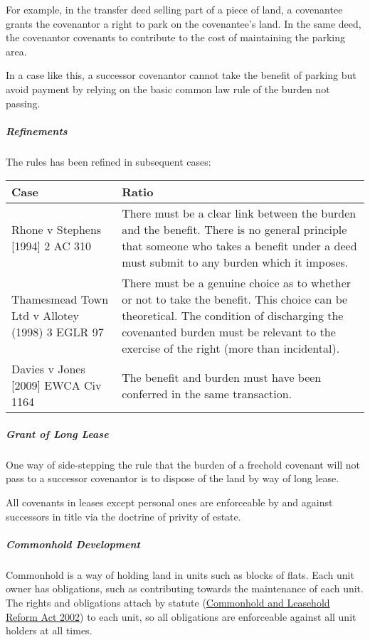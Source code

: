 \documentclass[
]{article}
\begin{document}
For example, in the transfer deed selling part of a piece of land, a
covenantee grants the covenantor a right to park on the covenantee's
land. In the same deed, the covenantor covenants to contribute to the
cost of maintaining the parking area.

In a case like this, a successor covenantor cannot take the benefit of
parking but avoid payment by relying on the basic common law rule of the
burden not passing.

\hypertarget{refinements}{%
\subparagraph{Refinements}\label{refinements}}

The rules has been refined in subsequent cases:

\begin{longtable}[]{@{}ll@{}}
\toprule()
Case & Ratio \\
\midrule()
\endhead
Rhone v Stephens {[}1994{]} 2 AC 310 & There must be a clear link
between the burden and the benefit. There is no general principle that
someone who takes a benefit under a deed must submit to any burden which
it imposes. \\
Thamesmead Town Ltd v Allotey (1998) 3 EGLR 97 & There must be a genuine
choice as to whether or not to take the benefit. This choice can be
theoretical. The condition of discharging the covenanted burden must be
relevant to the exercise of the right (more than incidental). \\
Davies v Jones {[}2009{]} EWCA Civ 1164 & The benefit and burden must
have been conferred in the same transaction. \\
\bottomrule()
\end{longtable}

\hypertarget{grant-of-long-lease}{%
\subparagraph{Grant of Long Lease}\label{grant-of-long-lease}}

One way of side-stepping the rule that the burden of a freehold covenant
will not pass to a successor covenantor is to dispose of the land by way
of long lease.

All covenants in leases except personal ones are enforceable by and
against successors in title via the doctrine of privity of estate.

\hypertarget{commonhold-development}{%
\subparagraph{Commonhold Development}\label{commonhold-development}}

Commonhold is a way of holding land in units such as blocks of flats.
Each unit owner has obligations, such as contributing towards the
maintenance of each unit. The rights and obligations attach by statute
(\href{https://www.legislation.gov.uk/ukpga/2002/15/contents}{Commonhold
and Leasehold Reform Act 2002}) to each unit, so all obligations are
enforceable against all unit holders at all times.
\end{document}
